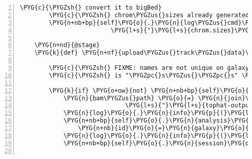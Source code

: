 \begin{Verbatim}[commandchars=\\\{\},numbers=left,firstnumber=1,stepnumber=5]
        \PYG{c}{\PYGZsh{} convert it to bigBed}
        \PYG{c}{\PYGZsh{} chrom\PYGZus{}sizes already generated during "transterm\PYGZus{}hp"}
        \PYG{n+nb+bp}{self}\PYG{o}{.}\PYG{n}{log\PYGZus{}cmd}\PYG{p}{(}\PYG{l+s}{"}\PYG{l+s}{bedToBigBed}\PYG{l+s}{"}\PYG{p}{,} \PYG{n}{track\PYGZus{}name} \PYG{o}{+} \PYG{l+s}{"}\PYG{l+s}{.bed}\PYG{l+s}{"}\PYG{p}{,}
                         \PYG{l+s}{"}\PYG{l+s}{chrom.sizes}\PYG{l+s}{"}\PYG{p}{,} \PYG{n}{track\PYGZus{}name} \PYG{o}{+} \PYG{l+s}{"}\PYG{l+s}{.bigbed}\PYG{l+s}{"}\PYG{p}{)}

    \PYG{n+nd}{@stage}
    \PYG{k}{def} \PYG{n+nf}{upload\PYGZus{}track\PYGZus{}data}\PYG{p}{(}\PYG{n+nb+bp}{self}\PYG{p}{)}\PYG{p}{:}

        \PYG{c}{\PYGZsh{} FIXME: names are not unique on galaxy:}
        \PYG{c}{\PYGZsh{} is "\PYGZpc{}s\PYGZus{}\PYGZpc{}s" \PYGZpc{} (srr\PYGZus{}name, self.analysis.org\PYGZus{}accession) good enough ?}

        \PYG{k}{if} \PYG{o+ow}{not} \PYG{n+nb+bp}{self}\PYG{o}{.}\PYG{n}{analysis}\PYG{o}{.}\PYG{n}{galaxy\PYGZus{}bam}\PYG{p}{:}
            \PYG{n}{bam\PYGZus{}path} \PYG{o}{=} \PYG{n}{join}\PYG{p}{(}\PYG{n+nb+bp}{self}\PYG{o}{.}\PYG{n}{analysis}\PYG{o}{.}\PYG{n}{data\PYGZus{}dir}\PYG{p}{,} 
                             \PYG{l+s}{"}\PYG{l+s}{tophat-output}\PYG{l+s}{"}\PYG{p}{,} \PYG{l+s}{"}\PYG{l+s}{accepted\PYGZus{}hits.bam}\PYG{l+s}{"}\PYG{p}{)}
            \PYG{n}{log}\PYG{o}{.}\PYG{n}{info}\PYG{p}{(}\PYG{l+s}{"}\PYG{l+s}{uploading accepted\PYGZus{}hits.bam to galaxy}\PYG{l+s}{"}\PYG{p}{)}
            \PYG{n+nb+bp}{self}\PYG{o}{.}\PYG{n}{analysis}\PYG{o}{.}\PYG{n}{galaxy\PYGZus{}bam} \PYG{o}{=} \PYG{n}{GalaxyDataset}\PYG{p}{(}
                \PYG{n+nb}{id}\PYG{o}{=}\PYG{n}{galaxy}\PYG{o}{.}\PYG{n}{upload}\PYG{p}{(}\PYG{n+nb}{open}\PYG{p}{(}\PYG{n}{bam\PYGZus{}path}\PYG{p}{)}\PYG{p}{,} \PYG{n+nb+bp}{self}\PYG{o}{.}\PYG{n}{bam\PYGZus{}name}\PYG{p}{)}\PYG{p}{)}
            \PYG{n}{log}\PYG{o}{.}\PYG{n}{info}\PYG{p}{(}\PYG{l+s}{"}\PYG{l+s}{...done - id: }\PYG{l+s+si}{\PYGZpc{}s}\PYG{l+s}{"} \PYG{o}{\PYGZpc{}} \PYG{n+nb+bp}{self}\PYG{o}{.}\PYG{n}{analysis}\PYG{o}{.}\PYG{n}{galaxy\PYGZus{}bam}\PYG{o}{.}\PYG{n}{id}\PYG{p}{)}
            \PYG{n+nb+bp}{self}\PYG{o}{.}\PYG{n}{session}\PYG{o}{.}\PYG{n}{commit}\PYG{p}{(}\PYG{p}{)}


\end{Verbatim}
